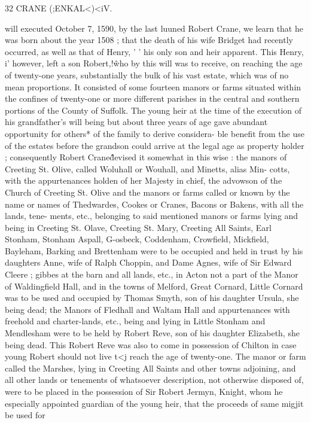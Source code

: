 \documentclass{book}
\begin{document}
32 CRANE (;ENKAL<)<iV. 

will executed October 7, 1590, by the last luuned Robert Crane, 
we learn that he was born about the year 1508 ; that the death of 
his wife Bridget had recently occurred, as well as that of Henry, ' ' 
his only son and heir apparent. This Henry, i' however, left a 
son Robert,!\^ who by this will was to receive, on reaching the age 
of twenty-one years, substantially the bulk of his vast estate, 
which was of no mean proportions. It consisted of some fourteen 
manors or farms situated within the confines of twenty-one or 
more different parishes in the central and southern portions of the 
County of Suffolk. The young heir at the time of the execution 
of his grandfather's will being but about three years of age gave 
abundant opportunity for others* of the family to derive considera- 
ble benefit from the use of the estates before the grandson could 
arrive at the legal age as property holder ; consequently Robert 
Crane\^\^ devised it somewhat in this wise : the manors of Creeting 
St. Olive, called Woluhall or Wouhall, and Minetts, alias Min- 
cotts, with the appurtenances holden of her Majesty in chief, the 
advowson of the Church of Creeting St. Olive and the manors or 
farms called or known by the name or names of Thedwardes, 
Cookes or Cranes, Bacons or Bakens, with all the lands, tene- 
ments, etc., belonging to said mentioned manors or farms lying 
and being in Creeting St. Olave, Creeting St. Mary, Creeting All 
Saints, Earl Stonham, Stonham Aspall, G-osbeck, Coddenham, 
Crowfield, Mickfield, Bayleham, Barking and Brettenham were to 
be occupied and held in trust by his daughters Anne, wife of 
Ralph Choppin, and Dame Agnes, wife of Sir Edward Cleere ; 
gibbes at the barn and all lands, etc., in Acton not a part of the 
Manor of Waldingfield Hall, and in the towns of Melford, Great 
Cornard, Little Cornard was to be used and occupied by Thomas 
Smyth, son of his daughter Ursula, she being dead; the Manors 
of Fledhall and Waltam Hall and appurtenances with freehold 
and charter-lands, etc., being and lying in Little Stonham and 
Mendlesham were to be held by Robert Reve, son of his daughter 
Elizabeth, she being dead. This Robert Reve was also to come 
in possession of Chilton in case young Robert should not live t<j 
reach the age of twenty-one. The manor or farm called the 
Marshes, lying in Creeting All Saints and other towns adjoining, 
and all other lands or tenements of whatsoever description, not 
otherwise disposed of, were to be placed in the possession of Sir 
Robert Jermyn, Knight, whom he especially appointed guardian 
of the young heir, that the proceeds of same migjit be used for 
\end{document}
